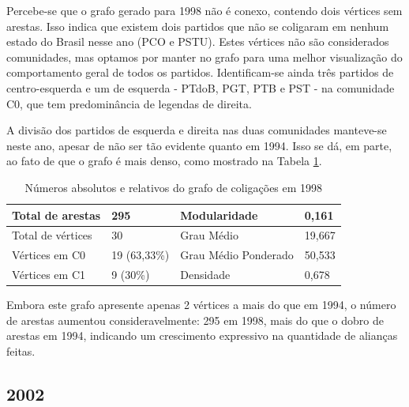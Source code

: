 
Percebe-se que o grafo gerado para 1998 não é conexo, contendo dois vértices sem arestas. Isso indica que existem dois partidos que não se coligaram em nenhum estado do Brasil nesse ano (\gls{PCO} e \gls{PSTU}). Estes vértices não são considerados comunidades, mas optamos por manter no grafo para uma melhor visualização do comportamento geral de todos os partidos. Identificam-se ainda três partidos de centro-esquerda e um de esquerda - \gls{PTdoB}, \gls{PGT}, \gls{PTB} e \gls{PST} - na comunidade C0, que tem predominância de legendas de direita.

A divisão dos partidos de esquerda e direita nas duas comunidades manteve-se neste ano, apesar de não ser tão evidente quanto em 1994. Isso se dá, em parte, ao fato de que o grafo é mais denso, como mostrado na Tabela \ref{table-1998}. 



\begin{table}[H]
\centering
\label{table-1998}
\begin{tabular}{|l|l|l|l|}
\hline
Total de arestas  & 295 & Modularidade         & 0,161 \\ \hline
Total de vértices & 30  & Grau Médio           & 19,667 \\ \hline
Vértices em C0    & 19  (63,33\%) & Grau Médio Ponderado & 50,533 \\ \hline
Vértices em C1    & 9 (30\%) & Densidade            &  0,678\\ \hline
\end{tabular}
\caption{Números absolutos e relativos do grafo de coligações em 1998}
\end{table}

Embora este grafo apresente apenas 2 vértices a mais do que em 1994, o número de arestas aumentou consideravelmente: 295 em 1998, mais do que o dobro de arestas em 1994, indicando um crescimento expressivo na quantidade de alianças feitas.


\subsection{2002}
\label{resultados__grafos--2002}


